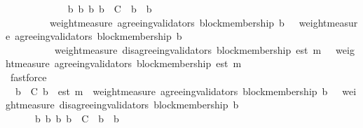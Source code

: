 \begin{isabellebody}
\ \ \ \ \ \ \isamarkupfalse%
\ {\isacartoucheopen}{\isasymforall}\ {\isasymsigma}\ {\isasymin}\ {\isasymSigma}{\isachardot}\ {\isasymforall}\ b\ b{\isacharprime}{\isachardot}\ {\isacharbraceleft}b{\isacharcomma}\ b{\isacharprime}{\isacharbraceright}\ {\isasymsubseteq}\ C\ {\isasymand}\ b{\isacharprime}\ {\isasymdownharpoonright}\ b\ \isanewline
\ \ \ \ \ \ \ \ {\isasymlongrightarrow}\ weight{\isacharunderscore}measure\ {\isacharparenleft}agreeing{\isacharunderscore}validators\ {\isacharparenleft}block{\isacharunderscore}membership\ b{\isacharprime}{\isacharcomma}\ {\isasymsigma}{\isacharparenright}{\isacharparenright}\ {\isasymge}\ weight{\isacharunderscore}measure\ {\isacharparenleft}agreeing{\isacharunderscore}validators\ {\isacharparenleft}block{\isacharunderscore}membership\ b{\isacharcomma}\ {\isasymsigma}{\isacharparenright}{\isacharparenright}{\isacartoucheclose}\isanewline
\ \ \ \ \ \ \ \ \ \ {\isacartoucheopen}weight{\isacharunderscore}measure\ {\isacharparenleft}disagreeing{\isacharunderscore}validators\ {\isacharparenleft}block{\isacharunderscore}membership\ {\isacharparenleft}est\ m{\isacharparenright}{\isacharcomma}\ {\isasymsigma}{\isacharprime}{\isacharparenright}{\isacharparenright}\ {\isacharless}\ weight{\isacharunderscore}measure\ {\isacharparenleft}agreeing{\isacharunderscore}validators\ {\isacharparenleft}block{\isacharunderscore}membership\ {\isacharparenleft}est\ m{\isacharparenright}{\isacharcomma}\ {\isasymsigma}{\isacharprime}{\isacharparenright}{\isacharparenright}{\isacartoucheclose}\isanewline
\ \ \ \ \ \ \ \ \ \ {\isacartoucheopen}{\isasymsigma}{\isacharprime}\ {\isasymin}\ {\isasymSigma}{\isacartoucheclose}\ \isamarkupfalse%
\ fastforce\ \ \ \ \ \ \isanewline
\ \ \ \ \isamarkupfalse%
\ {\isachardoublequoteopen}{\isasymforall}\ b{\isacharprime}\ {\isasymin}\ C{\isachardot}\ b{\isacharprime}\ {\isasymdownharpoonright}\ est\ m\ {\isasymlongrightarrow}\ weight{\isacharunderscore}measure\ {\isacharparenleft}agreeing{\isacharunderscore}validators\ {\isacharparenleft}block{\isacharunderscore}membership\ b{\isacharprime}{\isacharcomma}\ {\isasymsigma}{\isacharprime}{\isacharparenright}{\isacharparenright}\ {\isachargreater}\ weight{\isacharunderscore}measure\ {\isacharparenleft}disagreeing{\isacharunderscore}validators\ {\isacharparenleft}block{\isacharunderscore}membership\ b{\isacharprime}{\isacharcomma}\ {\isasymsigma}{\isacharprime}{\isacharparenright}{\isacharparenright}{\isachardoublequoteclose}\isanewline
\ \ \ \ \ \ \isamarkupfalse%
\ {\isacartoucheopen}{\isasymforall}\ {\isasymsigma}\ {\isasymin}\ {\isasymSigma}{\isachardot}\ {\isasymforall}\ b\ b{\isacharprime}{\isachardot}\ {\isacharbraceleft}b{\isacharcomma}\ b{\isacharprime}{\isacharbraceright}\ {\isasymsubseteq}\ C\ {\isasymand}\ b{\isacharprime}\ {\isasymdownharpoonright}\ b\isanewline

\end{isabellebody}
